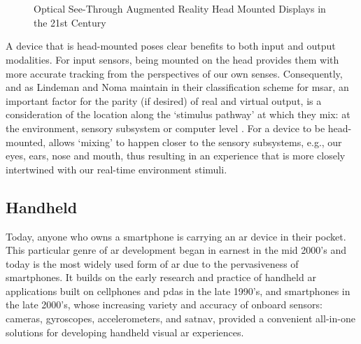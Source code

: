 \begin{figure}
    \centering
    \captionsetup{justification=centering}
    \quad
    \hfill
    \\
    \vspace{0.5cm}
    \quad
    \hfill
    \\
    \caption{Optical See-Through Augmented Reality Head Mounted Displays in the 21st Century}
    \label{fig: contemporaryHMDs}
\end{figure}

A device that is head-mounted poses clear benefits to both input and output modalities. For input sensors, being mounted on the head provides them with more accurate tracking from the perspectives of our own senses. Consequently, and as Lindeman and Noma maintain in their classification scheme for \gls{msar}, an important factor for the parity (if desired) of real and virtual output, is a consideration of the location along the `stimulus pathway' at which they mix: at the environment, sensory subsystem or computer level \citeyearpar{lindeman2007}. For a device to be head-mounted, allows `mixing' to happen closer to the sensory subsystems, e.g., our eyes, ears, nose and mouth, thus resulting in an experience that is more closely intertwined with our real-time environment stimuli.

\subsection{Handheld}\label{sec: ar-forms-mobile}
Today, anyone who owns a smartphone is carrying an \gls{ar} device in their pocket. This particular genre of \gls{ar} development began in earnest in the mid 2000's and today is the most widely used form of \gls{ar} due to the pervasiveness of smartphones. It builds on the early research and practice of handheld \gls{ar} applications built on cellphones and \glspl{pda} in the late 1990's, and smartphones in the late 2000's, whose increasing variety and accuracy of onboard sensors: cameras, gyroscopes, accelerometers, and \gls{satnav}, provided a convenient all-in-one solutions for developing handheld visual \gls{ar} experiences. 

